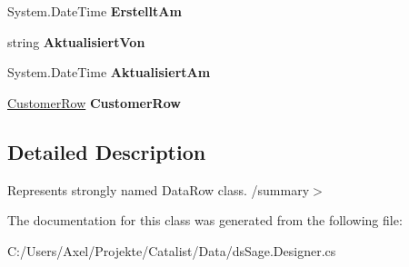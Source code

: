 \begin{DoxyCompactItemize}
\item 
System.\+Date\+Time {\bfseries Erstellt\+Am}\hypertarget{class_products_1_1_data_1_1ds_sage_1_1_kunde_maschine_xref_row_a3e710e77fa1a9d5732e788bfd9e36439}{}\label{class_products_1_1_data_1_1ds_sage_1_1_kunde_maschine_xref_row_a3e710e77fa1a9d5732e788bfd9e36439}

\item 
string {\bfseries Aktualisiert\+Von}\hypertarget{class_products_1_1_data_1_1ds_sage_1_1_kunde_maschine_xref_row_a1458eba699c4b5ffe55403c60b083ffa}{}\label{class_products_1_1_data_1_1ds_sage_1_1_kunde_maschine_xref_row_a1458eba699c4b5ffe55403c60b083ffa}

\item 
System.\+Date\+Time {\bfseries Aktualisiert\+Am}\hypertarget{class_products_1_1_data_1_1ds_sage_1_1_kunde_maschine_xref_row_aa86018635f5f1b5b17d740dbd3a0e07d}{}\label{class_products_1_1_data_1_1ds_sage_1_1_kunde_maschine_xref_row_aa86018635f5f1b5b17d740dbd3a0e07d}

\item 
\hyperlink{class_products_1_1_data_1_1ds_sage_1_1_customer_row}{Customer\+Row} {\bfseries Customer\+Row}\hypertarget{class_products_1_1_data_1_1ds_sage_1_1_kunde_maschine_xref_row_ac4220143569aad805aa297174fec3033}{}\label{class_products_1_1_data_1_1ds_sage_1_1_kunde_maschine_xref_row_ac4220143569aad805aa297174fec3033}

\end{DoxyCompactItemize}


\subsection{Detailed Description}
Represents strongly named Data\+Row class. /summary$>$ 

The documentation for this class was generated from the following file\+:\begin{DoxyCompactItemize}
\item 
C\+:/\+Users/\+Axel/\+Projekte/\+Catalist/\+Data/ds\+Sage.\+Designer.\+cs\end{DoxyCompactItemize}
